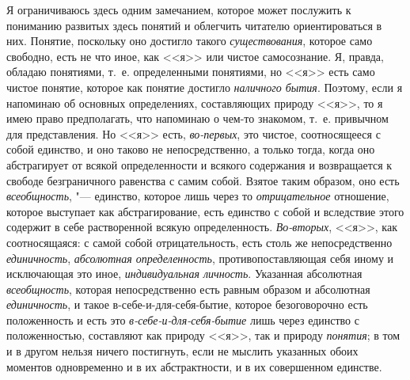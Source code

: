 Я ограничиваюсь здесь одним замечанием, которое может послужить к пониманию
развитых здесь понятий и облегчить читателю ориентироваться в них. Понятие,
поскольку оно достигло такого {\em существования}, которое само свободно,
есть не что иное, как <<я>> или чистое самосознание. Я, правда, обладаю
понятиями, т.~е. определенными понятиями, но <<я>> есть само чистое понятие,
которое как понятие достигло {\em наличного бытия}. Поэтому, если я напоминаю
об основных определениях, составляющих природу <<я>>, то я имею право
предполагать, что напоминаю о чем-то знакомом, т.~е. привычном для
представления. Но <<я>> есть, {\em во-первых}, это чистое, соотносящееся с собой
единство, и оно таково не непосредственно, а только тогда, когда оно
абстрагирует от всякой определенности и всякого содержания и возвращается к
свободе безграничного равенства с самим собой. Взятое таким образом, оно
есть {\em всеобщность}, "--- единство, которое лишь через то {\em отрицательное}
отношение, которое выступает как абстрагирование, есть единство с собой и
вследствие этого содержит в себе растворенной всякую определенность. {\em Во-вторых},
<<я>>, как соотносящаяся: с самой собой отрицательность, есть столь же
непосредственно {\em единичность}, {\em абсолютная определенность},
противопоставляющая себя иному и исключающая это иное, {\em индивидуальная личность}.
Указанная абсолютная {\em всеобщность}, которая непосредственно есть равным
образом и абсолютная {\em единичность}, и такое в-себе-и-для-себя-бытие,
которое безоговорочно есть положенность и есть это {\em в-себе-и-для-себя-бытие}
лишь через единство с положенностью, составляют как природу <<я>>, так и
природу {\em понятия}; в том и в другом нельзя ничего постигнуть, если не
мыслить указанных обоих моментов одновременно и в их абстрактности, и в их
совершенном единстве.

